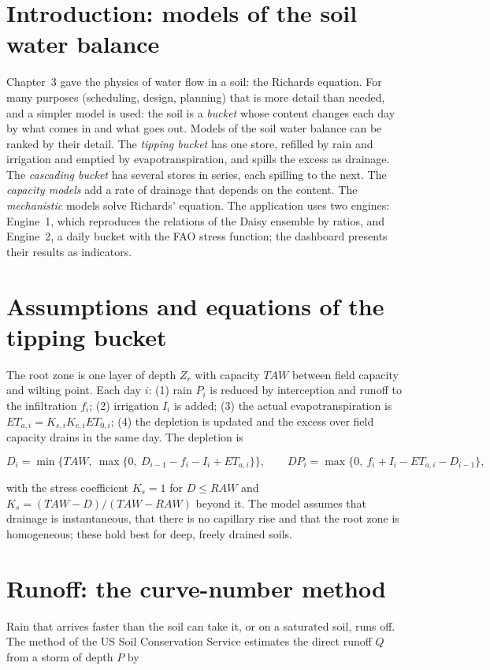 \section{Introduction: models of the soil water balance}
Chapter~3 gave the physics of water flow in a soil: the Richards equation. For many purposes (scheduling, design, planning) that is more detail than needed, and a simpler model is used: the soil is a \emph{bucket} whose content changes each day by what comes in and what goes out. Models of the soil water balance can be ranked by their detail. The \emph{tipping bucket} has one store, refilled by rain and irrigation and emptied by evapotranspiration, and spills the excess as drainage. The \emph{cascading bucket} has several stores in series, each spilling to the next. The \emph{capacity models} add a rate of drainage that depends on the content. The \emph{mechanistic} models solve Richards' equation. The application uses two engines: Engine~1, which reproduces the relations of the Daisy ensemble by ratios, and Engine~2, a daily bucket with the FAO stress function; the dashboard presents their results as indicators.

\section{Assumptions and equations of the tipping bucket}
The root zone is one layer of depth $Z_r$ with capacity $TAW$ between field capacity and wilting point. Each day $i$: (1) rain $P_i$ is reduced by interception and runoff to the infiltration $f_i$; (2) irrigation $I_i$ is added; (3) the actual evapotranspiration is $ET_{a,i}=K_{s,i}K_{c,i}ET_{0,i}$; (4) the depletion is updated and the excess over field capacity drains in the same day. The depletion is

\begin{equation}D_i=\min\bigl\{TAW,\ \max\{0,\ D_{i-1}-f_i-I_i+ET_{a,i}\}\bigr\},\qquad DP_i=\max\{0,\ f_i+I_i-ET_{a,i}-D_{i-1}\},\label{eq:bucket8}\end{equation}


with the stress coefficient $K_s=1$ for $D\le RAW$ and $K_s=(TAW-D)/(TAW-RAW)$ beyond it. The model assumes that drainage is instantaneous, that there is no capillary rise and that the root zone is homogeneous; these hold best for deep, freely drained soils.

\section{Runoff: the curve-number method}
Rain that arrives faster than the soil can take it, or on a saturated soil, runs off. The  method of the US Soil Conservation Service estimates the direct runoff $Q$ from a storm of depth $P$ by

